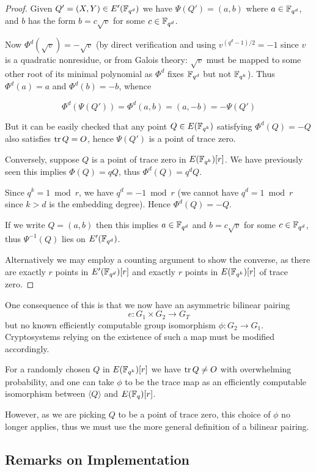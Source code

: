\begin{proof}
Given $Q' = (X,Y) \in E'(\mathbb{F}_{q^d})$ we have $\Psi(Q') = (a, b)$
where $a \in \mathbb{F}_{q^d}$, and $b$ has the form $b = c \sqrt{v}$ for some
$c \in \mathbb{F}_{q^d}$.

Now $\Phi^d(\sqrt{v}) = -\sqrt{v}$ (by direct verification and using
$v^{(q^d - 1)/2} = -1$ since $v$ is a quadratic nonresidue, or
from Galois theory: $\sqrt{v}$ must
be mapped to some other root of its minimal polynomial as $\Phi^d$ fixes
$\mathbb{F}_{q^d}$ but not $\mathbb{F}_{q^k}$).
Thus $\Phi^d(a) = a$ and $\Phi^d(b) = -b$, whence

\[ \Phi^d(\Psi(Q')) = \Phi^d(a,b) = (a, -b) = -\Psi(Q') \]

But it can be easily checked that
any point $Q \in E(\mathbb{F}_{q^k})$ satisfying $\Phi^d(Q) = -Q$ also satisfies
$\mathop{\rm tr} Q = O$, hence $\Psi(Q')$ is a point of trace zero.

Conversely, suppose $Q$ is a point of trace zero in $E(\mathbb{F}_{q^k})[r]$.
We have previously seen this implies $\Phi(Q) = q Q$,
thus $\Phi^d(Q) = q^d Q$.

Since $q^k = 1 \bmod r$, we have $q^d = -1 \bmod r$ (we cannot
have $q^d = 1 \bmod r$ since $k > d$ is the embedding degree).
Hence $\Phi^d(Q) = -Q$.

If we write $Q=(a,b)$ then this implies $a \in \mathbb{F}_{q^d}$ and $b = c \sqrt{v}$
for some $c \in \mathbb{F}_{q^d}$, thus $\Psi^{-1}(Q)$ lies on $E'(\mathbb{F}_{q^d})$.

Alternatively we may employ a counting argument to show the converse,
as there are exactly
$r$ points in $E'(\mathbb{F}_{q^d})[r]$ and exactly $r$ points in $E(\mathbb{F}_{q^k})[r]$ of trace
zero.
\end{proof}

One consequence of this is that we
now have an asymmetric bilinear pairing
\[
e:G_1 \times G_2 \rightarrow G_T
\]
but no known efficiently computable group isomorphism
$\phi : G_2 \rightarrow G_1$. Cryptosystems relying on the existence of
such a map must be modified accordingly.

For a randomly chosen $Q$ in $E(\mathbb{F}_{q^k})[r]$ we have $\mathop{\rm tr} Q \ne O$ with
overwhelming probability, and one can take $\phi$ to be the trace map
as an efficiently computable isomorphism between $\langle Q \rangle$
and $E(\mathbb{F}_q)[r]$.

However, as we are picking $Q$ to be a point of trace zero, this choice
of $\phi$ no longer applies, thus we must use the more general definition
of a bilinear pairing.

\subsection {Remarks on Implementation}

